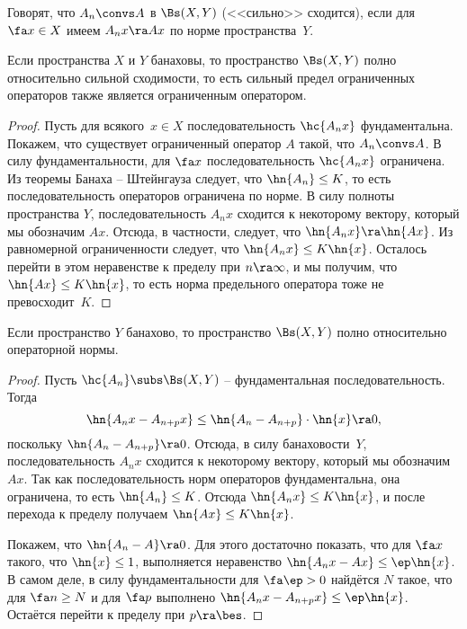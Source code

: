 \documentclass[a4paper]{article}
\begin{document}
\begin{df}
Говорят, что $A_n \convs A$ в $\Bs(X,Y)$ (<<сильно>> сходится), если
для $\fa x \in X$ имеем $A_n x\ra Ax$ по норме пространства~$Y$.
\end{df}

\begin{stm}
Если пространства $X$ и $Y$ банаховы, то пространство $\Bs(X,Y)$ полно
относительно сильной сходимости, то есть сильный предел ограниченных
операторов также является ограниченным оператором.
\end{stm}
\begin{proof}
Пусть для всякого~${x \in X}$ последовательность $\hc{A_nx}$ фундаментальна. Покажем, что
существует ограниченный оператор $A$ такой, что $A_n \convs A$.
В силу фундаментальности, для $\fa x$ последовательность $\hc{A_n x}$ ограничена.
Из теоремы Банаха -- Штейнгауза
следует, что $\hn{A_n} \le K$, то есть последовательность операторов ограничена по норме.
В силу полноты пространства $Y$, последовательность $A_n x$ сходится к некоторому вектору,
который мы обозначим $Ax$. Отсюда, в частности, следует, что $\hn{A_n x} \ra \hn{Ax}$.
Из равномерной ограниченности следует, что $\hn{A_n x} \le K\hn{x}$. Осталось перейти в
этом неравенстве к пределу при $n\ra\infty$, и мы получим,
что $\hn{Ax} \le K\hn{x}$, то есть норма предельного оператора тоже не превосходит~$K$.
\end{proof}

\begin{stm}
Если пространство $Y$ банахово, то пространство $\Bs(X,Y)$ полно относительно операторной нормы.
\end{stm}
\begin{proof}
Пусть $\hc{A_n} \subs \Bs(X,Y)$ -- фундаментальная последовательность. Тогда
$$\hn{A_nx - A_{n+p}x} \le \hn{A_n - A_{n+p}}\cdot \hn{x} \ra 0,$$
поскольку $\hn{A_n - A_{n+p}} \ra 0$.
Отсюда, в силу банаховости~$Y$, последовательность $A_nx$ сходится к некоторому вектору,
который мы обозначим $Ax$. Так как последовательность норм операторов фундаментальна,
она ограничена, то есть $\hn{A_n} \le K$. Отсюда $\hn{A_n x} \le K\hn{x}$, и после
перехода к пределу получаем $\hn{Ax} \le K\hn{x}$.

Покажем, что $\hn{A_n - A} \ra 0$. Для этого достаточно показать, что для $\fa x$ такого, что $\hn{x} \le 1$,
выполняется неравенство $\hn{A_n x - Ax} \le \ep\hn{x}$.
В самом деле, в силу фундаментальности для $\fa \ep > 0$ найдётся $N$ такое, что для
$\fa n \ge N$ и для $\fa p$ выполнено $\hn{A_n x- A_{n+p}x} \le \ep\hn{x}$. Остаётся
перейти к пределу при $p\ra\bes$.
\end{proof}
\end{document}
